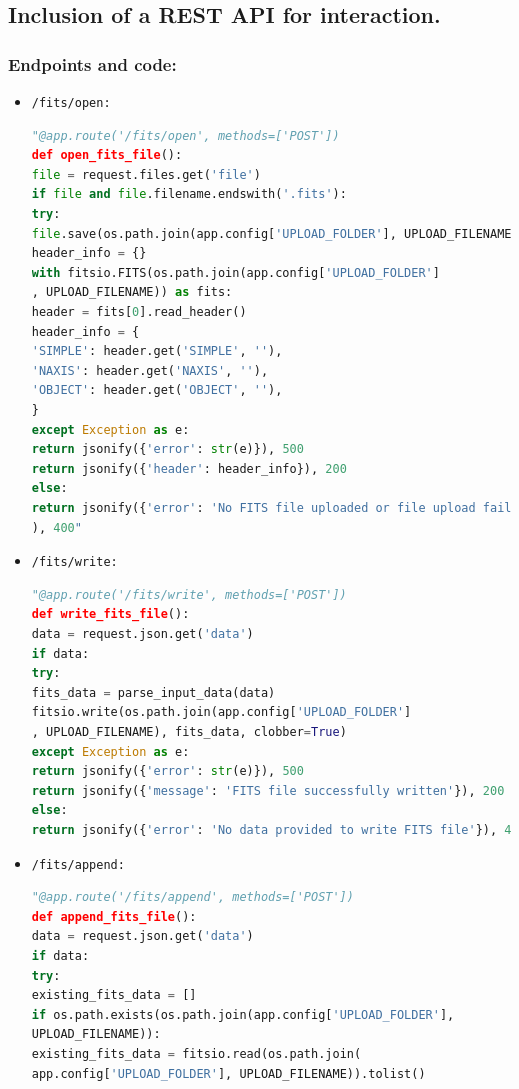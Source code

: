 \documentclass[a4paper,oneside,11pt]{book}
\begin{document}
\subsection{Inclusion of a REST API for interaction.}
\subsubsection{Endpoints and code:}
\begin{itemize}
    \item \texttt{/fits/open:}
    \begin{lstlisting}[language=Python, caption={Endpoint to open a FITS file}]
"@app.route('/fits/open', methods=['POST'])
def open_fits_file():
file = request.files.get('file')
if file and file.filename.endswith('.fits'):
try:
file.save(os.path.join(app.config['UPLOAD_FOLDER'], UPLOAD_FILENAME))
header_info = {}
with fitsio.FITS(os.path.join(app.config['UPLOAD_FOLDER']
, UPLOAD_FILENAME)) as fits:
header = fits[0].read_header()
header_info = {
'SIMPLE': header.get('SIMPLE', ''),
'NAXIS': header.get('NAXIS', ''),
'OBJECT': header.get('OBJECT', ''),
}
except Exception as e:
return jsonify({'error': str(e)}), 500
return jsonify({'header': header_info}), 200
else:
return jsonify({'error': 'No FITS file uploaded or file upload failed'}
), 400"
    \end{lstlisting}
    \item \texttt{/fits/write:}
    \begin{lstlisting}[language=Python, caption={Endpoint to rewrite a FITS file}]
"@app.route('/fits/write', methods=['POST'])
def write_fits_file():
data = request.json.get('data')
if data:
try:
fits_data = parse_input_data(data)
fitsio.write(os.path.join(app.config['UPLOAD_FOLDER']
, UPLOAD_FILENAME), fits_data, clobber=True)
except Exception as e:
return jsonify({'error': str(e)}), 500
return jsonify({'message': 'FITS file successfully written'}), 200
else:
return jsonify({'error': 'No data provided to write FITS file'}), 400"
    \end{lstlisting}
    \item \texttt{/fits/append:}
    \begin{lstlisting}[language=Python, caption={Endpoint to append to a FITS file}]
"@app.route('/fits/append', methods=['POST'])
def append_fits_file():
data = request.json.get('data')
if data:
try:
existing_fits_data = []
if os.path.exists(os.path.join(app.config['UPLOAD_FOLDER'],
UPLOAD_FILENAME)):
existing_fits_data = fitsio.read(os.path.join(
app.config['UPLOAD_FOLDER'], UPLOAD_FILENAME)).tolist()

\end{lstlisting}
\end{itemize}
\end{document}
